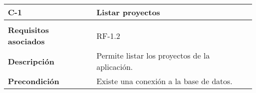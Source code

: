 \begin{longtable}[H]{@{}ll@{}}
\toprule
\begin{minipage}[b]{0.23\columnwidth}\raggedright\strut
\textbf{C-1}\strut
\end{minipage} & \begin{minipage}[b]{0.71\columnwidth}\raggedright\strut
\textbf{Listar proyectos}\strut
\end{minipage}\tabularnewline
\midrule
\endhead
\tabularnewline
\begin{minipage}[t]{0.23\columnwidth}\raggedright\strut
\textbf{Requisitos asociados}\strut
\end{minipage} & \begin{minipage}[t]{0.71\columnwidth}\raggedright\strut
RF-1.2\strut
\end{minipage}\tabularnewline
\begin{minipage}[t]{0.23\columnwidth}\raggedright\strut
\textbf{Descripción}\strut
\end{minipage} & \begin{minipage}[t]{0.71\columnwidth}\raggedright\strut
Permite listar los proyectos de la aplicación.\strut
\end{minipage}\tabularnewline
\begin{minipage}[t]{0.23\columnwidth}\raggedright\strut
\textbf{Precondición}\strut
\end{minipage} & \begin{minipage}[t]{0.71\columnwidth}\raggedright\strut
Existe una conexión a la base de datos.


\end{minipage}
\end{longtable}
